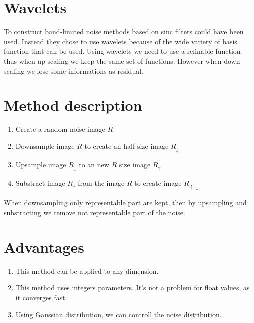 \documentclass[11pt,a4paper]{article}
\begin{document}
\section{Wavelets}

To construct band-limited noise methods based on sinc filters could have been used. Instead they chose to use wavelets because of the wide variety of basis function that can be used. Using wavelets we need to use a refinable function thus when up scaling we keep the same set of functions. However when down scaling we lose some informations as residual. 

\section{Method description}

\begin{enumerate}
\item Create a random noise image $R$
\item Downsample image $R$ to create an half-size image $R_\downarrow$
\item Upsample image $R_\downarrow$ to an new $R$ size image $R_\uparrow$
\item Substract image $R_\uparrow$ from the image $R$ to create image $R_{\uparrow\downarrow}$
\end{enumerate}
When downsampling only representable part are kept, then by upsampling and substracting we remove not representable part of the noise.

\section{Advantages}

\begin{enumerate}
\item This method can be applied to any dimension.
\item This method uses integers parameters. It's not a problem for float values, as it converges fast.
\item Using Gaussian distribution, we can controll the noise distribution.
\end{enumerate}
\end{document}
